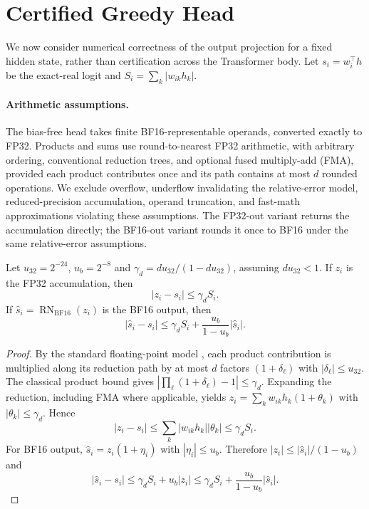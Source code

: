\section{Certified Greedy Head}
\label{sec:certified-head}

We now consider numerical correctness of the output projection for a fixed hidden state, rather than certification across the Transformer body. Let $s_i=w_i^\top h$ be the exact-real logit and $S_i=\sum_k|w_{ik}h_k|$.

\paragraph{Arithmetic assumptions.}
The bias-free head takes finite BF16-representable operands, converted exactly to FP32. Products and sums use round-to-nearest FP32 arithmetic, with arbitrary ordering, conventional reduction trees, and optional fused multiply-add (FMA), provided each product contributes once and its path contains at most $d$ rounded operations. We exclude overflow, underflow invalidating the relative-error model, reduced-precision accumulation, operand truncation, and fast-math approximations violating these assumptions. The FP32-out variant returns the accumulation directly; the BF16-out variant rounds it once to BF16 under the same relative-error assumptions.

\begin{proposition}
\label{prop:logit-error}
Let $u_{32}=2^{-24}$, $u_b=2^{-8}$ and $\gamma_d=du_{32}/(1-du_{32})$, assuming $du_{32}<1$. If $z_i$ is the FP32 accumulation, then
\begin{equation}
    |z_i-s_i|\leq\gamma_d S_i.
    \label{eq:fp32-error}
\end{equation}
If $\hat s_i=\operatorname{RN}_{\mathrm{BF16}}(z_i)$ is the BF16 output, then
\begin{equation}
    |\hat s_i-s_i|
    \leq\gamma_d S_i+
    \frac{u_b}{1-u_b}|\hat s_i|.
    \label{eq:bf16-error-observable}
\end{equation}
\end{proposition}

\begin{proof}
By the standard floating-point model \cite{higham2002accuracy}, each product contribution is multiplied along its reduction path by at most $d$ factors $(1+\delta_\ell)$ with $|\delta_\ell|\leq u_{32}$. The classical product bound gives $|\prod_\ell(1+\delta_\ell)-1|\leq\gamma_d$. Expanding the reduction, including FMA where applicable, yields $z_i=\sum_k w_{ik}h_k(1+\theta_k)$ with $|\theta_k|\leq\gamma_d$. Hence
\[
    |z_i-s_i|\leq\sum_k|w_{ik}h_k||\theta_k|
    \leq\gamma_d S_i.
\]
For BF16 output, $\hat s_i=z_i(1+\eta_i)$ with $|\eta_i|\leq u_b$. Therefore $|z_i|\leq|\hat s_i|/(1-u_b)$ and
\[
    |\hat s_i-s_i|
    \leq\gamma_d S_i+u_b|z_i|
    \leq\gamma_d S_i+
    \frac{u_b}{1-u_b}|\hat s_i|.
\]
\end{proof}

